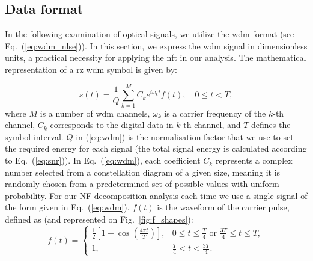 \subsection{Data format}


In the following examination of optical signals, we utilize the \gls{wdm} format (see Eq.~(\ref{eq:wdm_nlse})). In this section, we express the \gls{wdm} signal in dimensionless units, a practical necessity for applying the \Gls{nft} in our analysis. The mathematical representation of a \acrfull{rz} \acrshort{wdm} symbol is given by:

\begin{equation}
s(t) = \frac{1}{Q} \sum_{k=1}^{M} C_k e^{i \omega_k t} f(t), \quad 0 \leq t < T,
\label{eq:wdm}
\end{equation}
where $M$ is a number of \acrshort{wdm} channels, $\omega_k$ is a carrier frequency of the $k$-th channel, $C_k$ corresponds to the digital data in $k$-th channel, and $T$ defines the symbol interval.
$Q$ in (\ref{eq:wdm}) is the normalisation factor that we use to set the required energy for each signal (the total signal energy is calculated according to Eq.~(\ref{eq:snr})).
In Eq.~(\ref{eq:wdm}), each coefficient \( C_k \) represents a complex number selected from a constellation diagram of a given size, meaning it is randomly chosen from a predetermined set of possible values with uniform probability.
For our NF decomposition analysis each time we use a single signal of the form given in Eq.~(\ref{eq:wdm}). 
\( f(t) \) is the waveform of the carrier pulse, defined as (and represented on Fig.~\ref{fig:f_shapes}):
\begin{equation}
f(t) = 
\begin{cases} 
\frac{1}{2} \left[ 1 - \cos \left( \frac{4\pi t}{T} \right) \right], & 0 \leq t \leq \frac{T}{4} \text{ or } \frac{3T}{4} \leq t \leq T, \\
1, & \frac{T}{4} < t < \frac{3T}{4}.
\end{cases}
\label{eq:wdm_envelope}
\end{equation}



